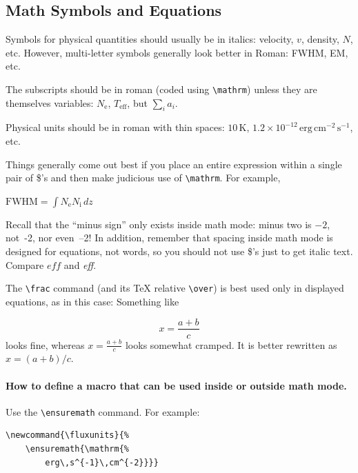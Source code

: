 \documentclass[9pt,article,twoside]{rmaa-rho-class/rmaa-rho}
\newcommand{\CS}[1]{\texttt{\textbackslash #1}}
\newenvironment{Example}
{\begin{list}{}{\setlength{\leftmargin}{10pt}\setlength{\rightmargin}{10pt}}%
  \item[]\itshape}
  {\end{list}}
\begin{document}
    \subsection{Math Symbols and Equations} \label{sec:math}

        Symbols for physical quantities should usually be in italics: velocity, $v$, density, $N$, etc. However, multi-letter symbols generally look better in Roman: FWHM, EM, etc. 
    
        The subscripts should be in roman (coded using \CS{mathrm}) unless they are themselves variables: $N_\mathrm{e}$, $T_\mathrm{eff}$, but $\sum_i a_i$. 
        
        Physical units should be in roman with thin spaces: $10\,\mathrm{K}$, $1.2\times10^{-12}\,\mathrm{erg\,cm^{-2}\,s^{-1}}$, etc. 
    
        Things generally come out best if you place an entire expression within a single pair of \$'s and then make judicious use of \CS{mathrm}. For example,
    
        \begin{Example}
          $ \mathrm{FWHM} = \int N_\mathrm{e} N_\mathrm{i} \, dz $ 
        \end{Example}
    
        Recall that the ``minus sign'' only exists inside math mode: minus two is $-2$, not~-2, nor \hbox{even --2!} In addition, remember that spacing inside math mode is designed for equations, not words, so you should not use \$'s just to get italic text. Compare $eff$ and \textit{eff}. 
    
        The \CS{frac} command (and its \TeX{} relative \CS{over}) is best used only in displayed equations, as in this case: Something like 
    
        \begin{equation} \label{ec:Equation1}
            x = \frac { a + b } { c } 
        \end{equation}
    looks fine, whereas $x = \frac { a + b } { c }$ looks somewhat cramped. It is better rewritten as $x = (a + b) / c $. 
    
        \paragraph{How to define a macro that can be used inside or outside math mode.} Use the \CS{ensuremath} command. For example: 
    
\begin{verbatim}
\newcommand{\fluxunits}{%
    \ensuremath{\mathrm{%
        erg\,s^{-1}\,cm^{-2}}}}
\end{verbatim}
    
\end{document}
